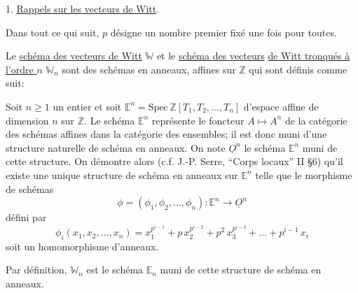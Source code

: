 1.  \uline{Rappels sur les vecteurs de Witt}.

Dans tout ce qui suit, $p$  désigne un nombre premier fixé
une fois pour toutes.

Le \uline{schéma des vecteurs de Witt} $\mathbb{W}$  et le \uline{schéma des vecteurs}
\uline{de Witt tronqués à l'ordre  $n$} $\mathbb{W}_n$  sont des schémas en anneaux, affines
sur $\mathbb{Z}$ qui sont définis comme suit:

Soit  $n \geq 1$  un entier et soit  $\mathbb{E}^n = \mathrm{Spec}\, \mathbb{Z}[T_1,T_2,\dots,T_n]$
d'espace affine de dimension  $n$  sur  $\mathbb{Z}$.  Le schéma  $\mathbb{E}^n$  représente
le foncteur  $A \mapsto A^n$  de la catégorie des schémas affines dans la
catégorie des ensembles; il est donc muni d'une structure naturelle de
schéma en anneaux.  On note  $\underline{O}^n$  le schéma  $\mathbb{E}^n$  muni de cette structure.
On démontre alors (c.f. J.-P. Serre, ``Corps locaux'' II §6) qu'il existe
une unique structure de schéma en anneaux sur  $\mathbb{E}^n$  telle que le morphisme
de schémas
\[
\phi = (\phi_1,\phi_2,\dots,\phi_n) \colon \mathbb{E}^n \to \underline{O}^n
\]
défini par
\[
\phi_i(x_1,x_2,\dots,x_n) = x_1^{p^{i-1}} + p\, x_2^{p^{i-2}} + p^2\, x_3^{p^{i-3}} + \dots + p^{i-1}\, x_i
\]
soit un homomorphisme d'anneaux.

Par définition, $\mathbb{W}_n$  est le schéma  $\mathbb{E}_n$  muni de cette structure
de schéma en anneaux.

